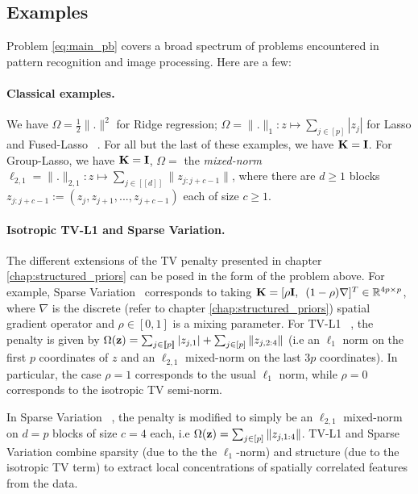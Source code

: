 \subsection{Examples}
Problem \eqref{eq:main_pb} covers a broad spectrum of problems
encountered in pattern recognition and image processing. Here are a few:

\paragraph*{Classical examples.}
We have $\Omega = \frac{1}{2}\|.\|^2$ for Ridge regression;
$\Omega = \|.\|_1: z \mapsto \sum_{j \in [p]}|z_j|$
for Lasso and Fused-Lasso ~\citep{Tibshirani05}. For all but the last of
these examples, we have $\mathbf{K} = \mathbf{I}$. For Group-Lasso, we have $\mathbf{K}=\mathbf{I}$,
$\Omega = $ the \textit{mixed-norm} $\ell_{2,1}= \|.\|_{2,1}:z
\mapsto \sum_{j \in [\![d]\!]}\|z_{j:j+c-1}\|$, where there are $d \ge
1$ blocks $z_{j:j+c-1}:=(z_j, z_{j+1}, ..., z_{j+c-1})$ each of size $c \ge
1$. %
\label{sec:examples}

\paragraph*{Isotropic TV-L1 and Sparse Variation.}
The different extensions of the TV penalty presented in chapter \ref{chap:structured_priors} can be posed in the form of the problem above.
For example, Sparse Variation~\citep{eickenberg2015total} corresponds to taking
$\mathbf{K} = [\rho\mathbf{I},\hspace{.5em}(1-\rho)\nabla]^T \in
\mathbb{R}^{4p \times p}$, where $\nabla$ is the discrete
(refer to chapter \ref{chap:structured_priors}) spatial gradient operator
and $\rho \in [0, 1]$ is a mixing parameter.
For TV-L1 ~\citep{baldassarre2012,gramfort2013}, the penalty is
given by $\Omega(\mathbf{z}) = \sum_{j \in [\![p]\!]}|z_{j,1}| + \sum_{j \in
  [p]}\|z_{j,2:4}\|$ (i.e an $\ell_1$ norm on the first $p$
coordinates of $z$ and an $\ell_{2,1}$ mixed-norm on the last $3p$
coordinates). In particular, the case $\rho = 1$
corresponds to the usual $\ell_1$ norm, while $\rho = 0$ corresponds to
the isotropic TV semi-norm.

In Sparse Variation ~\citep{eickenberg2015total}, 
the penalty is modified to simply be an $\ell_{2,1}$
mixed-norm on $d = p$ blocks of size $c = 4$ each, i.e
$\Omega(\mathbf{z}) = \sum_{j \in [p]}\|z_{j,1:4}\|$. 
TV-L1 and Sparse Variation combine sparsity (due to the
the $\ell_1$-norm) and structure (due to the isotropic TV term) to
extract local concentrations of spatially correlated features
from the data.%


